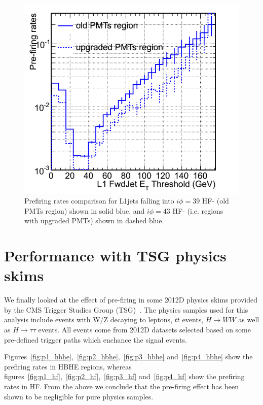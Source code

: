 \documentclass[11pt]{cmspaperpdf}
\begin{document}
\begin{figure}
\centering
\includegraphics[scale=0.45]{plots/rates_comparison_old-vs-new-PMTs.png}
\caption{Prefiring rates comparison for L1jets falling into $i \phi=39$ HF- (old PMTs region) shown in solid blue, and $i \phi=43$ HF- (i.e. regions with upgraded PMTs) shown in dashed blue. }
\label{fig:imp} 
\end{figure}
 

\newpage
\section{Performance with TSG physics skims}

We finally looked at the effect of pre-firing in some 2012D physics skims provided by the CMS Trigger Studies Group (TSG)~\cite{tsg}. The physics samples used for this analysis include events with W/Z decaying to leptons, $t \bar{t}$ events, $H \rightarrow WW$ as well as $H \rightarrow \tau\tau$ events. All events come from 2012D datasets selected based on some pre-defined trigger paths which enchance the signal events.

Figures~\ref{fig:p1_hbhe},~\ref{fig:p2_hbhe},~\ref{fig:p3_hbhe} and~\ref{fig:p4_hbhe} show the prefiring rates in HBHE regions, whereas figures~\ref{fig:p1_hf},~\ref{fig:p2_hf},~\ref{fig:p3_hf} and~\ref{fig:p4_hf} show the prefiring rates in HF. From the above we conclude that the pre-firing effect has been shown to be negligible for pure physics samples.
\end{document}
